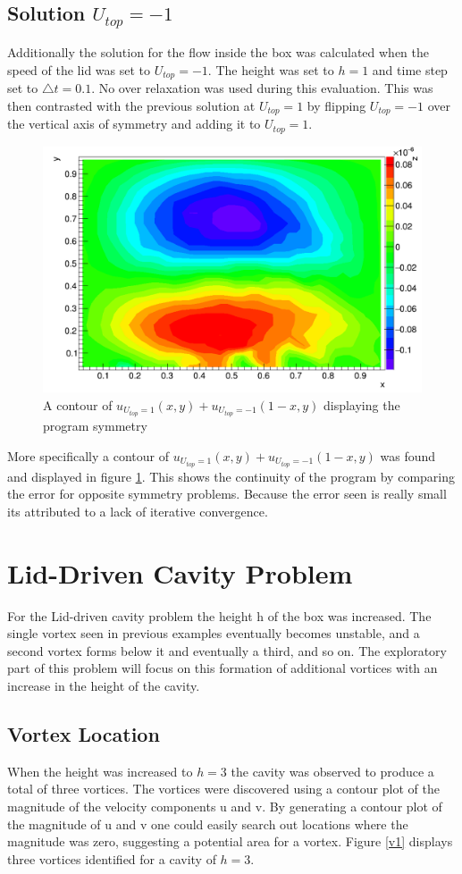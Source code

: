 \documentclass[paper=a4, fontsize=11pt, abstract=on]{scrartcl}
\numberwithin{equation}{section}		%
\numberwithin{figure}{section}			%
\numberwithin{table}{section}				%
\begin{document}
\subsection{Solution $U_{top} = -1$}
Additionally the solution for the flow inside the box was calculated when the speed of the lid was set to $U_{top} = -1$. The height was set to $h=1$ and time step set to $\triangle t = 0.1$. No over relaxation was used during this evaluation. This was then contrasted with the previous solution at $U_{top} = 1$ by flipping $U_{top} = -1$ over the vertical axis of symmetry and adding it to 
$U_{top} = 1$. 
\begin{figure}[H]
\centering
\includegraphics[width=0.80\linewidth]{sanity}
\caption{A contour of $u_{U_{top} = 1}(x,y) + u_{U_{top} = -1}(1-x,y)$ displaying the program symmetry}
\label{san1}
\end{figure}

More specifically a contour of $u_{U_{top} = 1}(x,y) + u_{U_{top} = -1}(1-x,y)$ was found and displayed in figure \ref{san1}. This shows the continuity of the program by comparing the error for opposite symmetry problems. Because the error seen is really small its attributed to a lack of iterative convergence.




\section{Lid-Driven Cavity Problem}
For the Lid-driven cavity problem the height h of the box was increased. The single vortex seen in previous examples eventually becomes unstable, and a second vortex forms below it and eventually a third, and so on. The exploratory part of this problem will focus on this formation of additional vortices with an increase in the height of the cavity. 

\subsection{Vortex Location}
When the height was increased to $h=3$ the cavity was observed to produce a total of three vortices. The vortices were discovered using a contour plot of the magnitude of the velocity components u and v. By generating a contour plot of the magnitude of u and v one could easily search out locations where the magnitude was zero, suggesting a potential area for a vortex. Figure \ref{v1} displays three vortices identified for a cavity of $h=3$.
\end{document}
